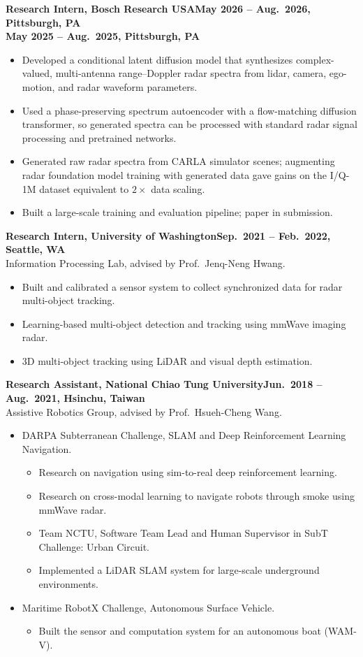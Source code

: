 \documentclass[11pt]{article}
\newcommand{\entry}[2]{\textbf{#1}\hfill\textbf{#2}\\}
\begin{document}
\medskip
\entry{Research Intern, Bosch Research USA}{May 2026 -- Aug.\ 2026, Pittsburgh, PA}
\mbox{}\hfill\textbf{May 2025 -- Aug.\ 2025, Pittsburgh, PA}
\begin{itemize}
  \item Developed a conditional latent diffusion model that synthesizes complex-valued, multi-antenna
    range--Doppler radar spectra from lidar, camera, ego-motion, and radar waveform parameters.
  \item Used a phase-preserving spectrum autoencoder with a flow-matching diffusion transformer, so
    generated spectra can be processed with standard radar signal processing and pretrained networks.
  \item Generated raw radar spectra from CARLA simulator scenes; augmenting radar foundation model
    training with generated data gave gains on the I/Q-1M dataset equivalent to $2\times$ data scaling.
  \item Built a large-scale training and evaluation pipeline; paper in submission.
\end{itemize}

\medskip
\entry{Research Intern, University of Washington}{Sep.\ 2021 -- Feb.\ 2022, Seattle, WA}
Information Processing Lab, advised by Prof.\ Jenq-Neng Hwang.
\begin{itemize}
  \item Built and calibrated a sensor system to collect synchronized data for radar multi-object tracking.
  \item Learning-based multi-object detection and tracking using mmWave imaging radar.
  \item 3D multi-object tracking using LiDAR and visual depth estimation.
\end{itemize}

\medskip
\entry{Research Assistant, National Chiao Tung University}{Jun.\ 2018 -- Aug.\ 2021, Hsinchu, Taiwan}
Assistive Robotics Group, advised by Prof.\ Hsueh-Cheng Wang.
\begin{itemize}
  \item DARPA Subterranean Challenge, SLAM and Deep Reinforcement Learning Navigation.
  \begin{itemize}
    \item Research on navigation using sim-to-real deep reinforcement learning.
    \item Research on cross-modal learning to navigate robots through smoke using mmWave radar.
    \item Team NCTU, Software Team Lead and Human Supervisor in SubT Challenge: Urban Circuit.
    \item Implemented a LiDAR SLAM system for large-scale underground environments.
  \end{itemize}
  \item Maritime RobotX Challenge, Autonomous Surface Vehicle.
  \begin{itemize}
    \item Built the sensor and computation system for an autonomous boat (WAM-V).
  \end{itemize}
\end{itemize}
\end{document}
